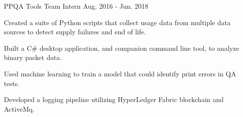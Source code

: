 \begin{cventries}
  \cventry
    {PPQA Tools Team Intern} %
    { } %
    { } %
    {Aug. 2016 - Jun. 2018} %
    {
      \begin{cvitems} %
        \item {Created a suite of Python scripts that collect usage data from multiple data sources to detect supply failures and end of life.}
        \item {Built a C\# desktop application, and companion command line tool, to analyze binary packet data.}
        \item {Used machine learning to train a model that could identify print errors in QA tests.}
        \item {Developed a logging pipeline utilizing HyperLedger Fabric blockchain and ActiveMq.}
      \end{cvitems}
    }

\end{cventries}
